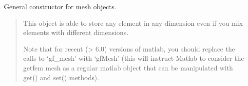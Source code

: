 \documentclass[a4paper,11pt,english]{sphinxmanual}
\begin{document}
\begin{sphinxVerbatim}[commandchars=\\\{\}]
      
    
    
      
    
      \PYG{p}{[}    \PYG{p}{[}  \PYG{p}{]}\PYG{p}{]}
\end{sphinxVerbatim}


General constructor for mesh objects.
\begin{quote}

This object is able to store any element in any dimension even if you mix
elements with different dimensions.

Note that for recent (\textgreater{} 6.0) versions of matlab, you should
replace the calls to ‘gf\_mesh’ with ‘gfMesh’ (this will instruct Matlab to
consider the getfem mesh as a regular matlab object that can be
manipulated with get() and set() methods).
\end{quote}
\end{document}

